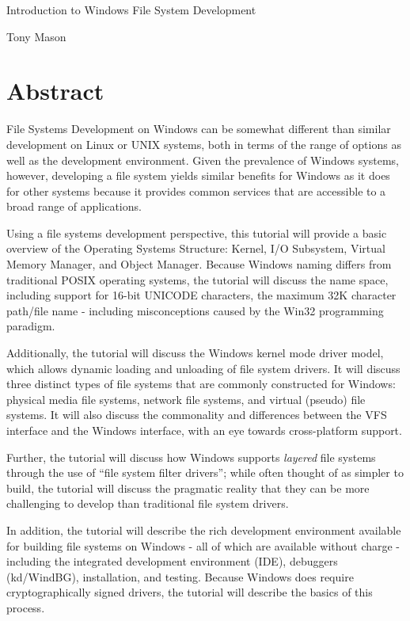 \documentclass[letter,11pt]{article}
\begin{document}
\begin{center}
    {\MakeUppercase\Huge Introduction to Windows File System Development}

    \vspace{0.5cm}
    
    {\MakeUppercase\Large Tony Mason}

\end{center}

\section*{Abstract}

File Systems Development on Windows can be somewhat different than similar development on Linux or UNIX systems, both in terms of the range of options as well as the development environment.  Given the prevalence of Windows systems, however, developing a file system yields similar benefits for Windows as it does for other systems because it provides common services that are accessible to a broad range of applications.

Using a file systems development perspective, this tutorial will provide a basic overview of the Operating Systems Structure: Kernel, I/O Subsystem, Virtual Memory Manager, and Object Manager.  Because Windows naming differs from traditional POSIX operating systems, the tutorial will discuss the name space, including support for 16-bit UNICODE characters, the maximum 32K character path/file name - including misconceptions caused by the Win32 programming paradigm.

Additionally, the tutorial will discuss the Windows kernel mode driver model, which allows dynamic loading and unloading of file system drivers.  It will discuss three distinct types of file systems that are commonly constructed for Windows: physical media file systems, network file systems, and virtual (pseudo) file systems.  It will also discuss the commonality and differences between the VFS interface and the Windows interface, with an eye towards cross-platform support.

Further, the tutorial will discuss how Windows supports \textit{layered} file systems through the use of ``file system filter drivers''; while often thought of as simpler to build, the tutorial will discuss the pragmatic reality that they can be more challenging to develop than traditional file system drivers.

In addition, the tutorial will describe the rich development environment available for building file systems on Windows - all of which are available without charge - including the integrated development environment (IDE), debuggers (kd/WindBG), installation, and testing.  Because Windows does require cryptographically signed drivers, the tutorial will describe the basics of this process. 
\end{document}
